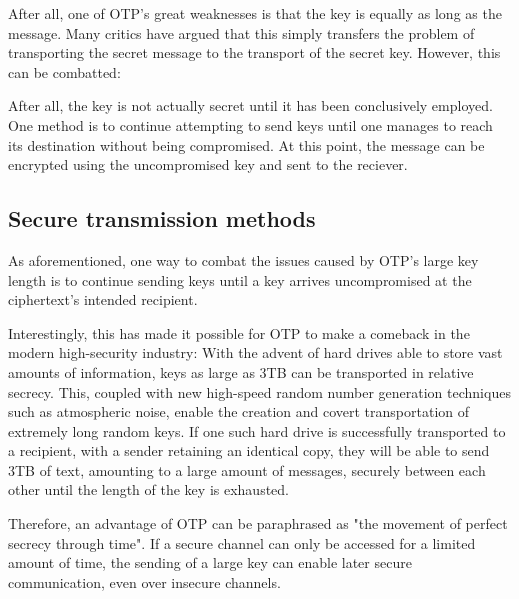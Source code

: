 \documentclass[12pt]{report}
\theoremstyle{definition}
\theoremstyle{remark}
\begin{document}
After all, one of OTP's great weaknesses is that the key is equally as long as the message. Many critics have argued that this simply transfers the problem of transporting the secret message to the transport of the secret key. However, this can be combatted:

After all, the key is not actually secret until it has been conclusively employed. One method is to continue attempting to send keys until one manages to reach its destination without being compromised. At this point, the message can be encrypted using the uncompromised key and sent to the reciever.

\subsection{Secure transmission methods}
As aforementioned, one way to combat the issues caused by OTP's large key length is to continue sending keys until a key arrives uncompromised at the ciphertext's intended recipient.

\begin{center}
\end{center}

Interestingly, this has made it possible for OTP to make a comeback in the modern high-security industry: With the advent of hard drives able to store vast amounts of information, keys as large as 3TB can be transported in relative secrecy. This, coupled with new high-speed random number generation techniques such as atmospheric noise\cite{RandomOrg}, enable the creation and covert transportation of extremely long random keys. If one such hard drive is successfully transported to a recipient, with a sender retaining an identical copy, they will be able to send 3TB of text, amounting to a large amount of messages, securely between each other until the length of the key is exhausted.

Therefore, an advantage of OTP can be paraphrased as "the movement of perfect secrecy through time". If a secure channel can only be accessed for a limited amount of time, the sending of a large key can enable later secure communication, even over insecure channels.
\end{document}
